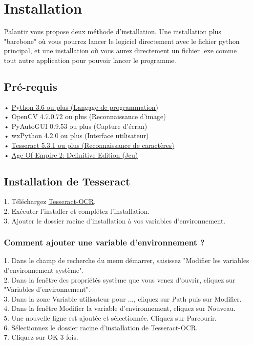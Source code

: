 
\section{Installation}

Palantir vous propose deux méthode d'installation. Une installation plus "barebone" où vous pourrez lancer le logiciel directement avec le fichier python principal, et une installation où vous aurez directement un fichier .exe comme tout autre application pour pouvoir lancer le programme.

\subsection{Pré-requis}
• \href{https://www.python.org/downloads/}{Python 3.6 ou plus (Langage de programmation)}\\
• OpenCV 4.7.0.72 ou plus (Reconnaissance d'image)\\
• PyAutoGUI 0.9.53 ou plus (Capture d'écran)\\
• wxPython 4.2.0 ou plus (Interface utilisateur)\\
• \href{https://github.com/UB-Mannheim/tesseract/wiki}{Tesseract 5.3.1 ou plus (Reconnaissance de caractères)}\\
• \href{https://www.ageofempires.com/games/aoeiide/}{Age Of Empire 2: Definitive Edition (Jeu)}

\subsection{Installation de Tesseract}
1. Téléchargez \href{https://github.com/UB-Mannheim/tesseract/wiki}{Tesseract-OCR}.\\
2. Exécuter l'installer et complétez l'installation.\\
3. Ajouter le dossier racine d'installation à vos variables d'environnement.

\subsubsection{Comment ajouter une variable d'environnement ?}
1. Dans le champ de recherche du menu démarrer, saisissez "Modifier les variables d’environnement système".\\
2. Dans la fenêtre des propriétés système que vous venez d'ouvrir, cliquez sur "Variables d'environnement".\\
3. Dans la zone Variable utilisateur pour ..., cliquez sur Path puis sur Modifier.\\
4. Dans la fenêtre Modifier la variable d'environnement, cliquez sur Nouveau.\\
5. Une nouvelle ligne est ajoutée et sélectionnée. Cliquez sur Parcourir.\\
6. Sélectionnez le dossier racine d'installation de Tesseract-OCR.\\
7. Cliquez sur OK 3 fois.

